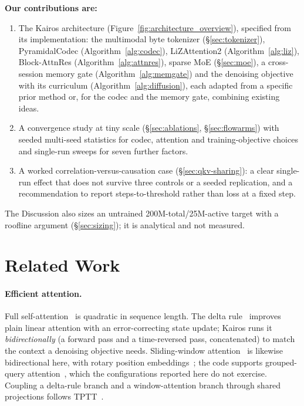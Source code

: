 \documentclass[11pt]{article}
\begin{document}
\textbf{Our contributions are:}
\begin{enumerate}
  \item The Kairos architecture (Figure~\ref{fig:architecture_overview}), specified from its implementation:
        the multimodal byte tokenizer (\S\ref{sec:tokenizer}), PyramidalCodec (Algorithm~\ref{alg:codec}), LiZAttention2
        (Algorithm~\ref{alg:liz}), Block-AttnRes
        (Algorithm~\ref{alg:attnres}), sparse MoE (\S\ref{sec:moe}), a
        cross-session memory gate (Algorithm~\ref{alg:memgate}) and the
        denoising objective with its curriculum
        (Algorithm~\ref{alg:diffusion}), each adapted from a specific prior
        method or, for the codec and the memory gate, combining existing
        ideas.
  \item A convergence study at tiny scale (\S\ref{sec:ablations}, \S\ref{sec:flowarms}) with seeded
        multi-seed statistics for codec, attention and training-objective choices and single-run sweeps for
        seven further factors.
  \item A worked correlation-versus-causation case
        (\S\ref{sec:qkv-sharing}): a clear single-run effect that does not
        survive three controls or a seeded replication, and a recommendation to report
        steps-to-threshold rather than loss at a fixed step.
\end{enumerate}
The Discussion also sizes an untrained 200M-total/25M-active target with a roofline argument
(\S\ref{sec:sizing}); it is analytical and not measured.

\section{Related Work}

\paragraph{Efficient attention.} Full self-attention~\citep{vaswani2017attention}
is quadratic in sequence length. The delta
rule~\citep{yang2024deltanet,yang2024gateddeltanet} improves plain linear
attention with an error-correcting state update; Kairos runs it
\emph{bidirectionally} (a forward pass and a time-reversed pass,
concatenated) to match the context a denoising objective needs.
Sliding-window attention~\citep{beltagy2020longformer,jiang2023mistral} is
likewise bidirectional here, with rotary position
embeddings~\citep{su2021roformer}; the code supports grouped-query
attention~\citep{ainslie2023gqa}, which the configurations reported here do
not exercise. Coupling a delta-rule branch and a window-attention branch
through shared projections follows TPTT~\citep{furfaro2025tptt}.
\end{document}
